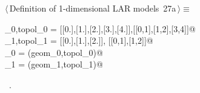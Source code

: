 \documentclass[11pt,oneside]{article}	%
\begin{document}
\begin{flushleft} \small
\begin{minipage}{\linewidth} \label{scrap66}
\protect{}$\langle\,$Definition of 1-dimensional LAR models\nobreak\ {\footnotesize 27a}$\,\rangle\equiv$
\vspace{-1ex}
\begin{list}{}{} \item
\mbox{}\verb@geom_0,topol_0 = [[0.],[1.],[2.],[3.],[4.]],[[0,1],[1,2],[3,4]]@\\
\mbox{}\verb@geom_1,topol_1 = [[0.],[1.],[2.]], [[0,1],[1,2]]@\\
\mbox{}\verb@mod_0 = (geom_0,topol_0)@\\
\mbox{}\verb@mod_1 = (geom_1,topol_1)@\\
\mbox{}\verb@@{\NWsep}
\end{list}
\vspace{-1ex}
\footnotesize\addtolength{\baselineskip}{-1ex}
\begin{list}{}{\setlength{\itemsep}{-\parsep}\setlength{\itemindent}{-\leftmargin}}
\item \NWtxtMacroRefIn\ .
\end{list}
\end{minipage}\\[4ex]
\end{flushleft}
\end{document}

